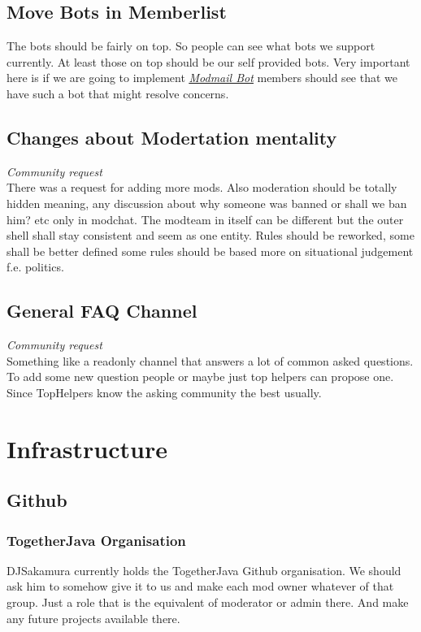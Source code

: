 \documentclass{article}
\newcommand{\refsection}[2]{\hyperref[#1]{\underline{\textit{#2}}}}
\begin{document}
    \subsection{Move Bots in Memberlist}
    The bots should be fairly on top. So people can see what bots we support currently. 
    At least those on top should be our self provided bots. 
    Very important here is if we are going to implement \refsection{sec:modmailbot}{Modmail Bot} members should see that we have such a bot that might resolve concerns.

    \subsection{Changes about Modertation mentality}
    \textit{Community request} \\ \newline 
    There was a request for adding more mods. Also moderation should be totally hidden meaning, 
    any discussion about why someone was banned or shall we ban him? etc only in modchat. 
    The modteam in itself can be different but the outer shell shall stay consistent and seem as one entity.
    Rules should be reworked, some shall be better defined some rules should be based more on situational judgement f.e. politics.

    \subsection{General FAQ Channel}
    \textit{Community request} \\ \newline 
    Something like a readonly channel that answers a lot of common asked questions. 
    To add some new question people or maybe just top helpers can propose one. 
    Since TopHelpers know the asking community the best usually.

    \section{Infrastructure}

    \subsection{Github}

    \subsubsection{TogetherJava Organisation}
    \label{sec:githuborganisation}
    DJSakamura currently holds the TogetherJava Github organisation. 
    We should ask him to somehow give it to us and make each mod owner whatever of that group. 
    Just a role that is the equivalent of moderator or admin there. And make any future projects available there.
\end{document}
